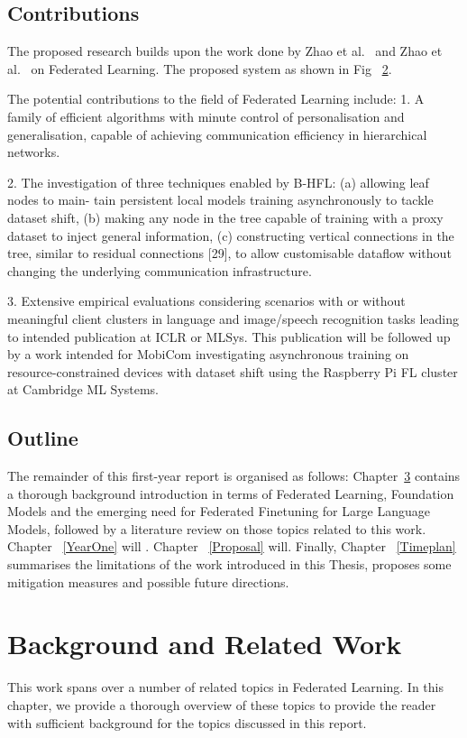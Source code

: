 \documentclass[withindex,glossary,firstyr]{cam-thesis}
\begin{document}
\section{Contributions} 
% 

The proposed research builds upon the work done by Zhao et al.~\cite{} and Zhao et al.~\cite{} on Federated Learning. The proposed system as shown in Fig ~\ref{}. 

The potential contributions to the field of Federated Learning include:
1. A family of efficient algorithms with minute control of personalisation and generalisation, capable of achieving communication efficiency in hierarchical networks.



2. The investigation of three techniques enabled by B-HFL: (a) allowing leaf nodes to main- tain persistent local models training asynchronously to tackle dataset shift, (b) making any node in the tree capable of training with a proxy dataset to inject general information, (c) constructing vertical connections in the tree, similar to residual connections [29], to allow customisable dataflow without changing the underlying communication infrastructure.

3. Extensive empirical evaluations considering scenarios with or without meaningful client clusters in language and image/speech recognition tasks leading to intended publication at ICLR or MLSys. This publication will be followed up by a work intended for MobiCom investigating asynchronous training on resource-constrained devices with dataset shift using the Raspberry Pi FL cluster at Cambridge ML Systems.

\section{Outline}
The remainder of this first-year report is organised as follows: Chapter~\ref{Background} contains a thorough background introduction in terms of Federated Learning, Foundation Models and the emerging need for Federated Finetuning for Large Language Models, followed by a literature review on those topics related to this work. Chapter ~\ref{YearOne} will . Chapter ~\ref{Proposal} will. Finally, Chapter ~\ref{Timeplan} summarises the limitations of the work introduced in this Thesis, proposes some mitigation measures and possible future directions. %


\chapter{Background and Related Work} \label{Background}
This work spans over a number of related topics in Federated Learning. In this chapter, we provide a thorough overview of these topics to provide the reader with sufficient background for the topics discussed in this report.
\end{document}
